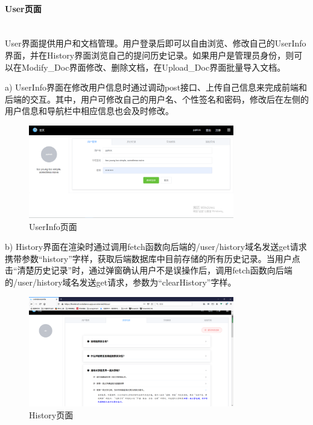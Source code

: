 \documentclass[12pt]{article}
\newcommand{\myparagraph}[1]{\paragraph{#1}\mbox{}\\}
\begin{document}
\myparagraph{User页面}

User界面提供用户和文档管理。用户登录后即可以自由浏览、修改自己的UserInfo界面，并在History界面浏览自己的提问历史记录。如果用户是管理员身份，则可以在Modify\_Doc界面修改、删除文档，在Upload\_Doc界面批量导入文档。

a) UserInfo界面在修改用户信息时通过调动post接口、上传自己信息来完成前端和后端的交互。其中，用户可修改自己的用户名、个性签名和密码，修改后在左侧的用户信息和导航栏中相应信息也会及时修改。

\begin{figure}[htbp]  %
    \centering  %
    \includegraphics[width=0.8\textwidth]{fig/userinfo.png}  %
    \caption{UserInfo页面}  %
    \label{fig:userinfo}  %
\end{figure}

b) History界面在渲染时通过调用fetch函数向后端的/user/history域名发送get请求携带参数“history”字样，获取后端数据库中目前存储的所有历史记录。当用户点击“清楚历史记录”时，通过弹窗确认用户不是误操作后，调用fetch函数向后端的/user/history域名发送get请求，参数为“clearHistory”字样。

\begin{figure}[htbp]  %
    \centering  %
    \includegraphics[width=0.8\textwidth]{fig/history2.PNG}  %
    \caption{History页面}  %
    \label{fig:structure}  %
\end{figure}
\end{document}
